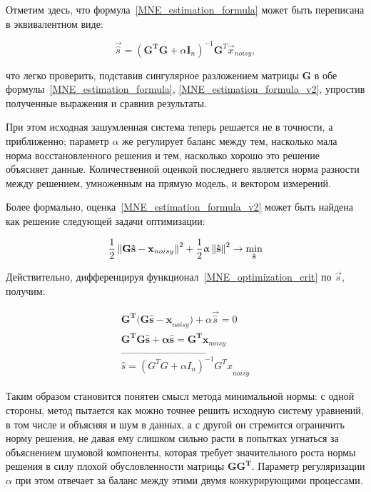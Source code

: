 Отметим здесь, что формула~\ref{MNE_estimation_formula} может быть переписана в
эквивалентном виде:

\begin{equation}
    \vec{\hat{s}} = (\mathbf{G^TG} + \alpha \mathbf{I}_n)^{-1}\mathbf{G}^T\vec{x}_{noisy},
    \label{MNE_estimation_formula_v2}
\end{equation}

что легко проверить, подставив сингулярное разложением матрицы $\mathbf{G}$ в
обе формулы~\ref{MNE_estimation_formula}, \ref{MNE_estimation_formula_v2},
упростив полученные выражения и сравнив результаты.

При этом исходная зашумленная система теперь решается не в точности, а
приближенно; параметр $\alpha$ же регулирует баланс между
тем, насколько мала норма восстановленного решения и тем, насколько
хорошо это решение объясняет данные. Количественной оценкой последнего
является норма разности между решением, умноженным на прямую модель,
и вектором измерений.

Более формально, оценка~\ref{MNE_estimation_formula_v2} может быть найдена
как решение следующей задачи оптимизации:

\begin{equation}
    \frac{1}{2}\left\lVert\mathbf{G\hat{s} - x}_{noisy}\right\rVert^2 + \frac{1}{2}\upalpha\left\lVert\mathbf{\hat{s}}\right\rVert^2 \rightarrow \underset{\mathbf{\hat{s}}}{\min}
    \label{MNE_optimization_crit}
\end{equation}

Действительно, дифференцируя функционал~\ref{MNE_optimization_crit} по $\vec{s}$,
получим:

\begin{gather*}
    \mathbf{G^T(G\hat{s} - x}_{noisy}) + \alpha\vec{\hat{s}} = 0\\
    \mathbf{G^TG\hat{s} + \alpha \hat{s} = G^Tx}_{noisy}\\
    \vec{\hat{s} = (G^TG + \alpha I_n)^{-1}G^Tx}_{noisy}
\end{gather*}


Таким образом становится понятен смысл метода минимальной нормы: с одной
стороны, метод пытается как можно точнее решить исходную систему уравнений, в
том числе и объясняя и шум в данных, а с другой он стремится ограничить норму
решения, не давая ему слишком сильно расти в попытках угнаться за объяснением
шумовой компоненты, которая требует значительного роста нормы решения в силу
плохой обусловленности матрицы $\mathbf{GG^T}$. Параметр регуляризации $\alpha$
при этом отвечает за баланс между этими двумя конкурирующими процессами.

